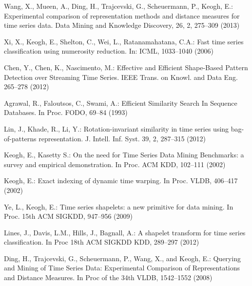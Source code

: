 \documentclass{llncs}
\begin{document}
%
%
\begin{thebibliography}{5}


Wang, X., Mueen, A., Ding, H., Trajcevski, G., Scheuermann, P., Keogh, E.:
Experimental comparison of representation methods and distance measures for time series data.
Data Mining and Knowledge Discovery, 26, 2, 275--309 (2013)

Xi, X., Keogh, E., Shelton, C., Wei, L., Ratanamahatana, C.A.:
Fast time series classification using numerosity reduction. 
In: ICML, 1033--1040 (2006)

Chen, Y., Chen, K., Nascimento, M.:
Effective and Efficient Shape-Based Pattern Detection over Streaming Time Series. 
IEEE Trans. on Knowl. and Data Eng. 265--278 (2012)

Agrawal, R., Faloutsos, C., Swami, A.:
Efficient Similarity Search In Sequence Databases.
In Proc. FODO, 69--84 (1993)

Lin, J., Khade, R., Li, Y.:
Rotation-invariant similarity in time series using bag-of-patterns representation. 
J. Intell. Inf. Syst. 39, 2, 287--315 (2012)

Keogh, E., Kasetty S.:
On the need for Time Series Data Mining Benchmarks: a survey and empirical demonstration.
In Proc. ACM KDD, 102--111 (2002)

Keogh, E.:
Exact indexing of dynamic time warping. 
In Proc. VLDB, 406--417 (2002)

Ye, L., Keogh, E.:
Time series shapelets: a new primitive for data mining.
In Proc. 15th ACM SIGKDD, 947--956 (2009)


Lines, J., Davis, L.M., Hills, J., Bagnall, A.:
A shapelet transform for time series classification. 
In Proc 18th ACM SIGKDD KDD, 289--297 (2012)

Ding, H., Trajcevski, G., Scheuermann, P., Wang, X., and Keogh, E.:
Querying and Mining of Time Series Data: Experimental Comparison of Representations and Distance
Measures. 
In Proc of the 34th VLDB, 1542--1552 (2008)


\end{thebibliography}
\end{document}

